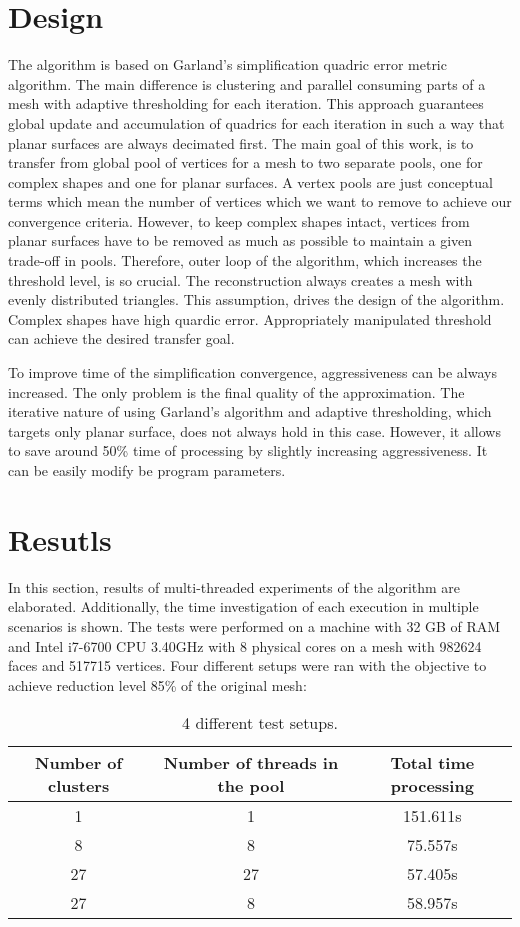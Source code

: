\newpage
\section{Design}

The algorithm is based on Garland's simplification quadric error metric algorithm. The main difference is clustering and parallel consuming parts of a mesh with adaptive thresholding for each iteration. This approach guarantees global update and accumulation of quadrics for each iteration in such a way that planar surfaces are always decimated first. The main goal of this work, is to transfer from global pool of vertices for a mesh to two separate pools, one for complex shapes and one for planar surfaces. A vertex pools are just conceptual terms which mean the number of vertices which we want to remove to achieve our convergence criteria. However, to keep complex shapes intact, vertices from planar surfaces have to be removed as much as possible to maintain a given trade-off in pools. Therefore, outer loop of the algorithm, which increases the threshold level, is so crucial. The reconstruction always creates a mesh with evenly distributed triangles. This assumption, drives the design of the algorithm. Complex shapes have high quardic error. Appropriately manipulated threshold can achieve the desired transfer goal.

To improve time of the simplification convergence, aggressiveness can be always increased. The only problem is the final quality of the approximation. The iterative nature of using Garland's algorithm and adaptive thresholding, which targets only planar surface, does not always hold in this case. However, it allows to save around 50\% time of processing by slightly increasing aggressiveness. It can be easily modify be program parameters.

\newpage
\section{Resutls}

In this section, results of multi-threaded experiments of the algorithm are elaborated. Additionally, the time investigation of each execution in multiple scenarios is shown. The tests were performed on a machine with 32 GB of RAM and Intel i7-6700 CPU 3.40GHz with 8 physical cores on a mesh with 982624 faces and 517715 vertices. Four different setups were ran with the objective to achieve reduction level 85\% of the original mesh:

\begin{table}[h!]
\centering
\begin{tabular}{ |c|c|c| } 
 \hline
 Number of clusters & Number of threads in the pool & Total time processing\\
 \hline
 1 & 1 & 151.611s\\ 
 8 & 8 & 75.557s\\ 
 27 & 27 & 57.405s\\
 27 & 8 & 58.957s\\
 \hline
\end{tabular}
\caption{4 different test setups.}
\end{table}

